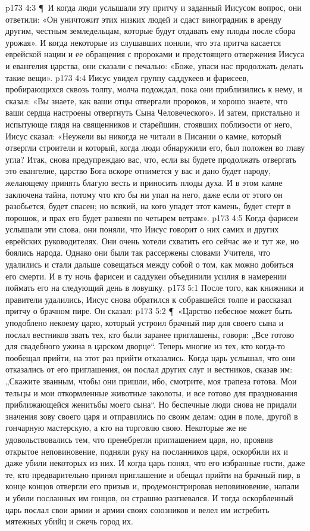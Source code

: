 \vs p173 4:3 \P\ И когда люди услышали эту притчу и заданный Иисусом вопрос, они ответили: «Он уничтожит этих низких людей и сдаст виноградник в аренду другим, честным земледельцам, которые будут отдавать ему плоды после сбора урожая». И когда некоторые из слушавших поняли, что эта притча касается еврейской нации и ее обращения с пророками и предстоящего отвержения Иисуса и евангелия царства, они сказали с печалью: «Боже, упаси нас продолжать делать такие вещи».
\vs p173 4:4 Иисус увидел группу саддукеев и фарисеев, пробирающихся сквозь толпу, молча подождал, пока они приблизились к нему, и сказал: «Вы знаете, как ваши отцы отвергали пророков, и хорошо знаете, что ваши сердца настроены отвергнуть Сына Человеческого». И затем, пристально и испытующе глядя на священников и старейшин, стоявших поблизости от него, Иисус сказал: «Неужели вы никогда не читали в Писании о камне, который отвергли строители и который, когда люди обнаружили его, был положен во главу угла? Итак, снова предупреждаю вас, что, если вы будете продолжать отвергать это евангелие, царство Бога вскоре отнимется у вас и дано будет народу, желающему принять благую весть и приносить плоды духа. И в этом камне заключена тайна, потому что кто бы ни упал на него, даже если от этого он разобьется, будет спасен; но всякий, на кого упадет этот камень, будет стерт в порошок, и прах его будет развеян по четырем ветрам».
\vs p173 4:5 Когда фарисеи услышали эти слова, они поняли, что Иисус говорит о них самих и других еврейских руководителях. Они очень хотели схватить его сейчас же и тут же, но боялись народа. Однако они были так рассержены словами Учителя, что удалились и стали дальше совещаться между собой о том, как можно добиться его смерти. И в ту ночь фарисеи и саддукеи объединили усилия в намерении поймать его на следующий день в ловушку.
\vs p173 5:1 После того, как книжники и правители удалились, Иисус снова обратился к собравшейся толпе и рассказал притчу о брачном пире. Он сказал:
\vs p173 5:2 \P\ «Царство небесное может быть уподоблено некоему царю, который устроил брачный пир для своего сына и послал вестников звать тех, кто были заранее приглашены, говоря: „Все готово для свадебного ужина в царском дворце“. Теперь многие из тех, кто когда\hyp{}то пообещал прийти, на этот раз прийти отказались. Когда царь услышал, что они отказались от его приглашения, он послал других слуг и вестников, сказав им: „Скажите званным, чтобы они пришли, ибо, смотрите, моя трапеза готова. Мои тельцы и мои откормленные животные заколоты, и все готово для празднования приближающейся женитьбы моего сына“. Но беспечные люди снова не придали значения зову своего царя и отправились по своим делам: один в поле, другой в гончарную мастерскую, а кто на торговлю свою. Некоторые же не удовольствовались тем, что пренебрегли приглашением царя, но, проявив открытое неповиновение, подняли руку на посланников царя, оскорбили их и даже убили некоторых из них. И когда царь понял, что его избранные гости, даже те, кто предварительно принял приглашение и обещал прийти на брачный пир, в конце концов отвергли его призыв и, продемонстрировав неповиновение, напали и убили посланных им гонцов, он страшно разгневался. И тогда оскорбленный царь послал свои армии и армии своих союзников и велел им истребить мятежных убийц и сжечь город их.
